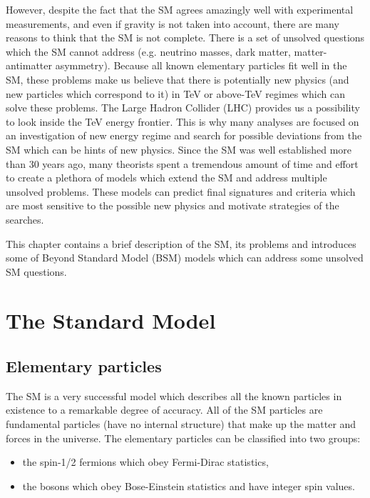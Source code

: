 However, despite the fact that the SM agrees amazingly well with experimental measurements, and even if gravity is not taken into account, 
there are many reasons to think that the SM is not complete.
There is a set of unsolved questions which the SM cannot address (e.g. neutrino masses, dark matter, matter-antimatter asymmetry).
Because all known elementary particles fit well in the SM, these problems make us believe that there is
potentially new physics (and new particles which correspond to it) in TeV or above-TeV regimes which can solve these problems.
The Large Hadron Collider (LHC) provides us a possibility to look inside the TeV energy frontier.
This is why many analyses are focused on an investigation of new energy regime and search for possible deviations from the SM which can be hints of new physics.
Since the SM was well established more than 30 years ago, many theorists spent a tremendous amount of time and effort to create
a plethora of models which extend the SM and address multiple unsolved problems. These models can predict final signatures and criteria which are most sensitive to the possible new physics and motivate strategies of the searches.

This chapter contains a brief description of the SM, its problems and introduces some of Beyond Standard Model (BSM) models which can address some unsolved SM questions.

\section{The Standard Model}

\subsection{Elementary particles}


The SM is a very successful model which describes all the known particles in existence to a remarkable degree of accuracy.
All of the SM particles are fundamental particles (have no internal structure) that make up the matter and forces in the universe.
The elementary particles can be classified into two groups: 
\begin{itemize}
 \item the spin-1/2 fermions which obey Fermi-Dirac statistics,
 \item the bosons which obey Bose-Einstein statistics and have integer spin values.
\end{itemize}

